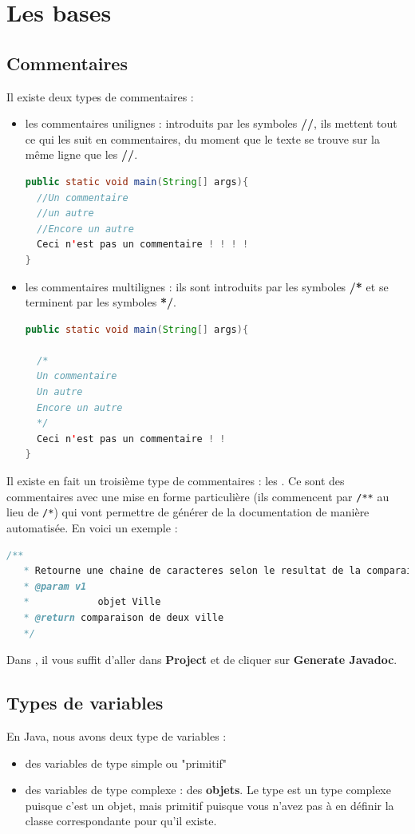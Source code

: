 \documentclass[a4paper,twoside]{article}
\begin{document}
\section{Les bases}
\subsection{Commentaires}
Il existe deux types de commentaires : 
\begin{itemize}
\item les commentaires unilignes : introduits par les symboles \textbf{//}, ils mettent tout ce qui les suit en commentaires, du moment que le texte se trouve sur la même ligne que les \textbf{//}.
\begin{lstlisting}[language=java]
public static void main(String[] args){
  //Un commentaire
  //un autre
  //Encore un autre
  Ceci n'est pas un commentaire ! ! ! !
}
\end{lstlisting}


\item les commentaires multilignes : ils sont introduits par les symboles \textbf{/*} et se terminent par les symboles \textbf{*/}.
\begin{lstlisting}[language=java]
public static void main(String[] args){
 
  /*
  Un commentaire
  Un autre
  Encore un autre
  */
  Ceci n'est pas un commentaire ! ! 
}
\end{lstlisting}
\end{itemize}

\bigskip

Il existe en fait un troisième type de commentaires : les . Ce sont des commentaires avec une mise en forme particulière (ils commencent par \verb|/**| au lieu de \verb|/*|) qui vont permettre de générer de la documentation de manière automatisée. En voici un exemple :
\begin{lstlisting}[language=java]
  /**
   * Retourne une chaine de caracteres selon le resultat de la comparaison
   * @param v1
   *            objet Ville
   * @return comparaison de deux ville
   */
\end{lstlisting}

Dans , il vous suffit d'aller dans \textbf{Project} et de cliquer sur \textbf{Generate Javadoc}.


\subsection{Types de variables}\label{sec:types_variables}
En Java, nous avons deux type de variables :
\begin{itemize}
\item des variables de type simple ou "primitif"
\item des variables de type complexe : des \textbf{objets}. Le type  est un type complexe puisque c'est un objet, mais primitif puisque vous n'avez pas à en définir la classe correspondante pour qu'il existe.
\end{itemize}
\end{document}
